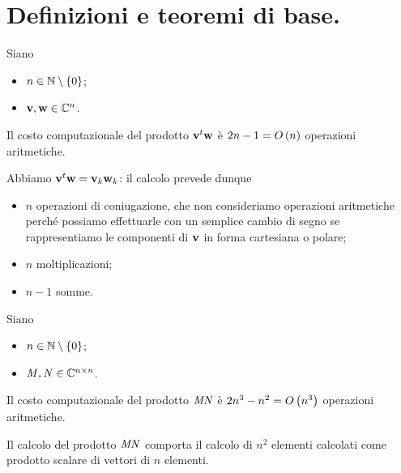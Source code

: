 \section{Definizioni e teoremi di base.}
\label{MetodiNumericiPerSistemiLineari_DefinizioniETeoremiDiBase}
\begin{Theorem}
  Siano
  \begin{itemize}
    \item $n \in \mathbb{N} \setminus \lbrace 0 \rbrace$;
    \item $\mathbf{v}, \mathbf{w} \in \mathbb{C}^n$.
  \end{itemize}
  Il costo computazionale del prodotto
  ${\mathbf{v}}^t\mathbf{w}$ \`e
  $2n - 1 = O \left ( n \right )$ operazioni aritmetiche.
\end{Theorem}
\Proof Abbiamo
${\mathbf{v}}^t\mathbf{w}
= \mathbf{v}_k\mathbf{w}_k$: il calcolo prevede dunque
\begin{itemize}
  \item $n$ operazioni di coniugazione, che non consideriamo operazioni
    aritmetiche perch\'e possiamo effettuarle con un semplice cambio di
    segno se rappresentiamo le componenti di $\mathbf{v}$ in forma cartesiana
    o polare;
  \item $n$ moltiplicazioni;
  \item $n - 1$ somme. \EndProof
\end{itemize}
\begin{Corollary}
  Siano
  \begin{itemize}
    \item $n \in \mathbb{N} \setminus \lbrace 0 \rbrace$;
    \item $\mathit{M}, \mathit{N} \in \mathbb{C}^{n \times n}$.
  \end{itemize}
  Il costo computazionale del prodotto
  $\mathit{M}\mathit{N}$ \`e
  $2n^3 - n^2 = O \left ( n^3 \right )$ operazioni aritmetiche.
\end{Corollary}
\Proof Il calcolo del prodotto
$\mathit{M}\mathit{N}$
comporta il calcolo di $n^2$ elementi calcolati come prodotto scalare
di vettori di $n$ elementi. \EndProof
